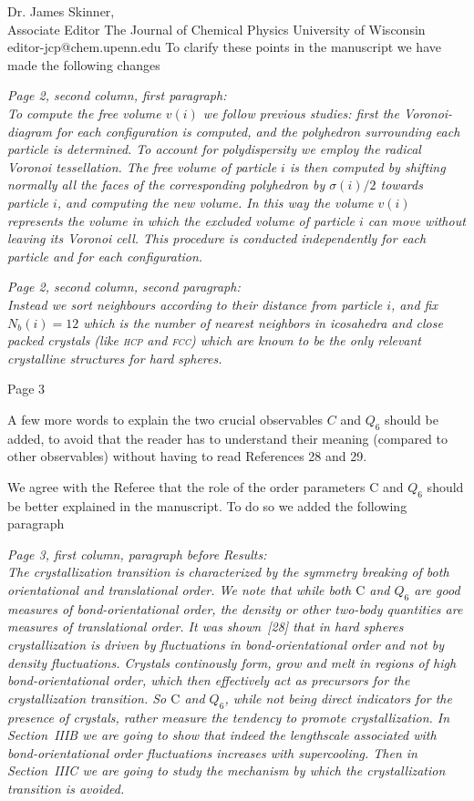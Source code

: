 \documentclass[a4paper, rebuttal, parskip=true, firsthead=false, fromemail=false, foldmarks=false]{scrlttr2}
\begin{document}
\begin{letter}{Dr. James Skinner,\\Associate Editor
The Journal of Chemical Physics
University of Wisconsin\\
editor-jcp@chem.upenn.edu }
To clarify these points in the manuscript we have made the following changes

{\it Page 2, second column, first paragraph:\\
To compute the free volume $v(i)$ we follow previous
studies: first the Voronoi-diagram for each configuration is computed, and the polyhedron
surrounding each particle is determined. To account for polydispersity we employ the radical Voronoi tessellation.
The free volume of particle $i$ is then
computed by shifting normally all the faces of the corresponding polyhedron by $\sigma(i)/2$
towards particle $i$, and computing the new volume. In this way
the volume $v(i)$ represents the volume in which the excluded volume of particle $i$ can move without leaving its Voronoi cell.
This procedure is conducted independently
for each particle and for each configuration.
}

{\it Page 2, second column, second paragraph:\\
Instead we
sort neighbours according to their distance from particle $i$, and
fix $N_b(i)=12$ which is the number of nearest neighbors in icosahedra and close packed crystals (like \textsc{hcp} and \textsc{fcc})
which are known to be the only relevant crystalline structures for hard spheres.
}


\begin{quotationi}
Page 3

A few more words to explain the two crucial observables $C$ and $Q_6$ should be added, to avoid that the reader has to understand their meaning (compared to other observables) without having to read References 28 and 29.
\end{quotationi}

We agree with the Referee that the role of the order parameters $\text{C}$ and $Q_6$ should be better explained in the manuscript. To do so we added the following
paragraph

{\it Page 3, first column, paragraph before Results:\\
The crystallization transition is characterized by
the symmetry breaking of both orientational and translational order.
We note that while both $\text{C}$ and $Q_6$ are good measures of bond-orientational order, the density or other two-body
quantities are measures of translational order.  It was shown~[28] that in hard spheres crystallization is
driven by fluctuations in bond-orientational order and not by density fluctuations. Crystals continously form, grow and melt
in regions of high bond-orientational order, which then effectively act as precursors for the crystallization transition.
So $\text{C}$ and $Q_6$, while not
being direct indicators for the presence of crystals, rather measure the tendency to promote crystallization. In Section~IIIB we are going to show
that indeed the lengthscale associated with bond-orientational order fluctuations increases with supercooling. Then in Section~IIIC we are going to study
the mechanism by which the crystallization transition is avoided.
}


\end{letter}
\end{document}
